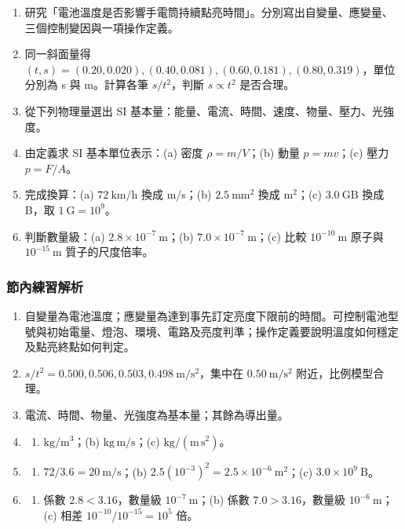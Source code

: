 \documentclass[11pt,a4paper]{article}
\providecommand{\tightlist}{%
  \setlength{\itemsep}{0pt}\setlength{\parskip}{0pt}}
\begin{document}
\begin{enumerate}
\def\labelenumi{\arabic{enumi}.}
\tightlist
\item
  研究「電池溫度是否影響手電筒持續點亮時間」。分別寫出自變量、應變量、三個控制變因與一項操作定義。
\item
  同一斜面量得 \((t,s)=(0.20,0.020),(0.40,0.081),(0.60,0.181),(0.80,0.319)\)，單位分別為 s 與 m。計算各筆 \(s/t^2\)，判斷 \(s\propto t^2\) 是否合理。
\item
  從下列物理量選出 SI 基本量：能量、電流、時間、速度、物量、壓力、光強度。
\item
  由定義求 SI 基本單位表示：(a) 密度 \(\rho=m/V\)；(b) 動量 \(p=mv\)；(c) 壓力 \(p=F/A\)。
\item
  完成換算：(a) \(72\ \mathrm{km/h}\) 換成 m/s；(b) \(2.5\ \mathrm{mm^2}\) 換成 \(\mathrm{m^2}\)；(c) \(3.0\ \mathrm{GB}\) 換成 B，取 \(1\ \mathrm G=10^9\)。
\item
  判斷數量級：(a) \(2.8\times10^{-7}\ \mathrm m\)；(b) \(7.0\times10^{-7}\ \mathrm m\)；(c) 比較 \(10^{-10}\ \mathrm m\) 原子與 \(10^{-15}\ \mathrm m\) 質子的尺度倍率。
\end{enumerate}

\subsubsection{節內練習解析}\label{ux7bc0ux5167ux7df4ux7fd2ux89e3ux6790-1}

\begin{enumerate}
\def\labelenumi{\arabic{enumi}.}
\tightlist
\item
  自變量為電池溫度；應變量為達到事先訂定亮度下限前的時間。可控制電池型號與初始電量、燈泡、環境、電路及亮度判準；操作定義要說明溫度如何穩定及點亮終點如何判定。
\item
  \(s/t^2=0.500,0.506,0.503,0.498\ \mathrm{m/s^2}\)，集中在 \(0.50\ \mathrm{m/s^2}\) 附近，比例模型合理。
\item
  電流、時間、物量、光強度為基本量；其餘為導出量。
\item
  \begin{enumerate}
  \def\labelenumii{(\alph{enumii})}
  \tightlist
  \item
    \(\mathrm{kg/m^3}\)；(b) \(\mathrm{kg\,m/s}\)；(c) \(\mathrm{kg/(m\,s^2)}\)。
  \end{enumerate}
\item
  \begin{enumerate}
  \def\labelenumii{(\alph{enumii})}
  \tightlist
  \item
    \(72/3.6=20\ \mathrm{m/s}\)；(b) \(2.5(10^{-3})^2=2.5\times10^{-6}\ \mathrm{m^2}\)；(c) \(3.0\times10^9\ \mathrm B\)。
  \end{enumerate}
\item
  \begin{enumerate}
  \def\labelenumii{(\alph{enumii})}
  \tightlist
  \item
    係數 \(2.8<3.16\)，數量級 \(10^{-7}\ \mathrm m\)；(b) 係數 \(7.0>3.16\)，數量級 \(10^{-6}\ \mathrm m\)；(c) 相差 \(10^{-10}/10^{-15}=10^5\) 倍。
  \end{enumerate}
\end{enumerate}
\end{document}
